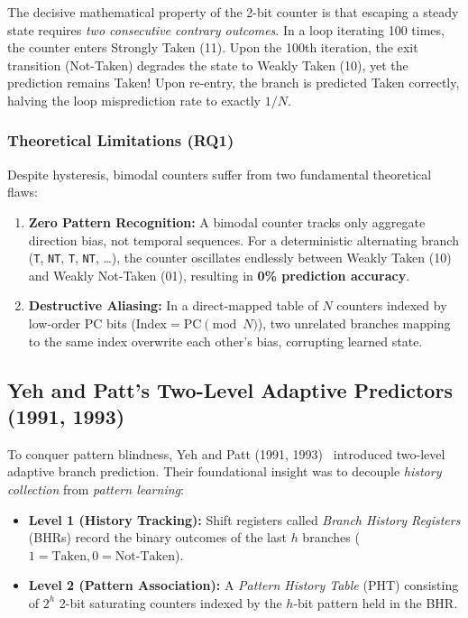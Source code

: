 \documentclass[11pt,a4paper]{article}
\begin{document}
The decisive mathematical property of the 2-bit counter is that escaping a steady state requires \textit{two consecutive contrary outcomes}. In a loop iterating 100 times, the counter enters Strongly Taken (11). Upon the 100th iteration, the exit transition (Not-Taken) degrades the state to Weakly Taken (10), yet the prediction remains Taken! Upon re-entry, the branch is predicted Taken correctly, halving the loop misprediction rate to exactly $1/N$.

\subsubsection{Theoretical Limitations (RQ1)}
Despite hysteresis, bimodal counters suffer from two fundamental theoretical flaws:
\begin{enumerate}[leftmargin=1.8em, itemsep=0.3em]
    \item \textbf{Zero Pattern Recognition:} A bimodal counter tracks only aggregate direction bias, not temporal sequences. For a deterministic alternating branch (\texttt{T}, \texttt{NT}, \texttt{T}, \texttt{NT}, \dots), the counter oscillates endlessly between Weakly Taken (10) and Weakly Not-Taken (01), resulting in \textbf{0\% prediction accuracy}.
    \item \textbf{Destructive Aliasing:} In a direct-mapped table of $N$ counters indexed by low-order PC bits ($\text{Index} = \text{PC} \pmod N$), two unrelated branches mapping to the same index overwrite each other's bias, corrupting learned state.
\end{enumerate}

\subsection{Yeh and Patt's Two-Level Adaptive Predictors (1991, 1993)}
\label{sec:yeh_patt}
To conquer pattern blindness, Yeh and Patt (1991, 1993)~\cite{yeh1991, yeh1993} introduced two-level adaptive branch prediction. Their foundational insight was to decouple \textit{history collection} from \textit{pattern learning}:
\begin{itemize}[leftmargin=1.5em, itemsep=0.3em]
    \item \textbf{Level 1 (History Tracking):} Shift registers called \textit{Branch History Registers} (BHRs) record the binary outcomes of the last $h$ branches ($1 = \text{Taken}, 0 = \text{Not-Taken}$).
    \item \textbf{Level 2 (Pattern Association):} A \textit{Pattern History Table} (PHT) consisting of $2^h$ 2-bit saturating counters indexed by the $h$-bit pattern held in the BHR.
\end{itemize}
\end{document}

